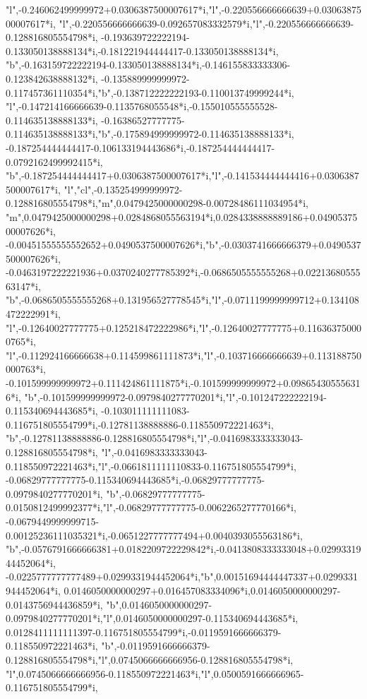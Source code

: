 \documentclass[border=5pt]{standalone}%
\begin{document}
\begin{luacode*}
{"l",-0.246062499999972+0.0306387500007617*i,"l",-0.220556666666639+0.0306387500007617*i,
"l",-0.220556666666639-0.092657083332579*i,"l",-0.220556666666639-0.128816805554798*i,
-0.193639722222194-0.133050138888134*i,-0.181221944444417-0.133050138888134*i,
"b",-0.163159722222194-0.133050138888134*i,-0.146155833333306-0.123842638888132*i,
-0.135889999999972-0.117457361110354*i,"b",-0.138712222222193-0.110013749999244*i,
"l",-0.147214166666639-0.1135768055548*i,-0.155010555555528-0.114635138888133*i,
-0.16386527777775-0.114635138888133*i,"b",-0.175894999999972-0.114635138888133*i,
-0.187254444444417-0.106133194443686*i,-0.187254444444417-0.0792162499992415*i,
"b",-0.187254444444417+0.0306387500007617*i,"l",-0.141534444444416+0.0306387500007617*i,
"l","cl",-0.135254999999972-0.128816805554798*i,"m",0.0479425000000298-0.00728486111034954*i,
"m",0.0479425000000298+0.0284868055563194*i,0.0284338888889186+0.0490537500007626*i,
-0.00451555555552652+0.0490537500007626*i,"b",-0.0303741666666379+0.0490537500007626*i,
-0.0463197222221936+0.0370240277785392*i,-0.0686505555555268+0.0221368055563147*i,
"b",-0.0686505555555268+0.131956527778545*i,"l",-0.0711199999999712+0.134108472222991*i,
"l",-0.12640027777775+0.125218472222986*i,"l",-0.12640027777775+0.116363750000765*i,
"l",-0.112924166666638+0.114599861111873*i,"l",-0.103716666666639+0.113188750000763*i,
-0.101599999999972+0.111424861111875*i,-0.101599999999972+0.098654305556316*i,
"b",-0.101599999999972-0.0979840277770201*i,"l",-0.101247222222194-0.115340694443685*i,
-0.103011111111083-0.116751805554799*i,-0.12781138888886-0.118550972221463*i,
"b",-0.12781138888886-0.128816805554798*i,"l",-0.0416983333333043-0.128816805554798*i,
"l",-0.0416983333333043-0.118550972221463*i,"l",-0.0661811111110833-0.116751805554799*i,
-0.06829777777775-0.115340694443685*i,-0.06829777777775-0.0979840277770201*i,
"b",-0.06829777777775-0.0150812499992377*i,"l",-0.06829777777775-0.0062265277770166*i,
-0.0679449999999715-0.00125236111035321*i,-0.0651227777777494+0.0040393055563186*i,
"b",-0.0576791666666381+0.0182209722229842*i,-0.0413808333333048+0.0299331944452064*i,
-0.0225777777777489+0.0299331944452064*i,"b",0.00151694444447337+0.0299331944452064*i,
0.0146050000000297+0.016457083334096*i,0.0146050000000297-0.0143756944436859*i,
"b",0.0146050000000297-0.0979840277770201*i,"l",0.0146050000000297-0.115340694443685*i,
0.0128411111111397-0.116751805554799*i,-0.0119591666666379-0.118550972221463*i,
"b",-0.0119591666666379-0.128816805554798*i,"l",0.0745066666666956-0.128816805554798*i,
"l",0.0745066666666956-0.118550972221463*i,"l",0.0500591666666965-0.116751805554799*i,
}
\end{luacode*}
\end{document}
